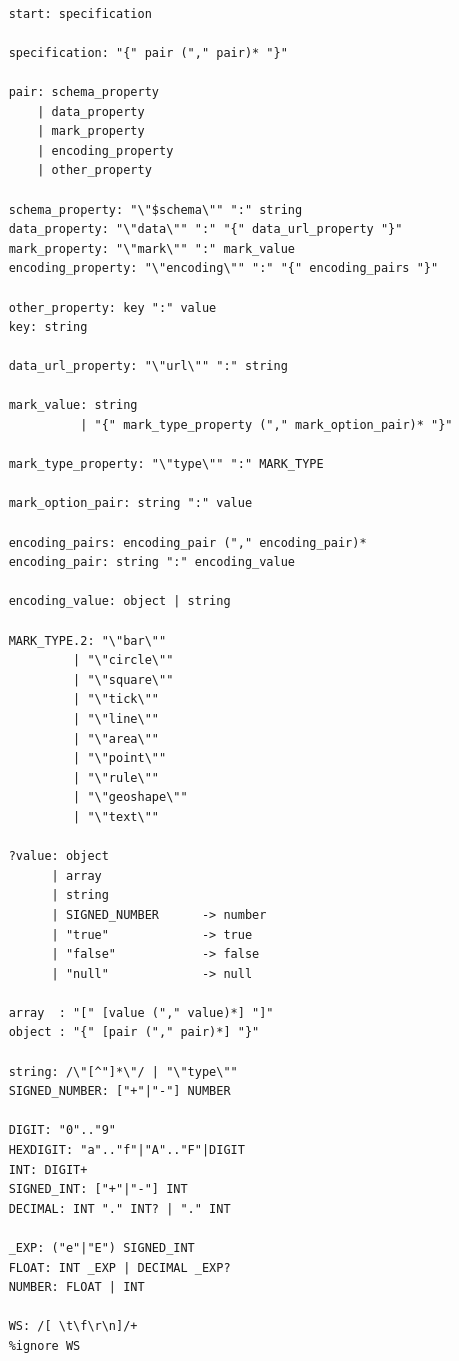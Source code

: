 \begin{lstlisting}[style=myGrammarStyle, caption=Vega-lite grammar]

    start: specification

    specification: "{" pair ("," pair)* "}"

    pair: schema_property
        | data_property
        | mark_property
        | encoding_property
        | other_property

    schema_property: "\"$schema\"" ":" string
    data_property: "\"data\"" ":" "{" data_url_property "}"
    mark_property: "\"mark\"" ":" mark_value
    encoding_property: "\"encoding\"" ":" "{" encoding_pairs "}"
    
    other_property: key ":" value
    key: string

    data_url_property: "\"url\"" ":" string

    mark_value: string
              | "{" mark_type_property ("," mark_option_pair)* "}"

    mark_type_property: "\"type\"" ":" MARK_TYPE

    mark_option_pair: string ":" value

    encoding_pairs: encoding_pair ("," encoding_pair)*
    encoding_pair: string ":" encoding_value

    encoding_value: object | string

    MARK_TYPE.2: "\"bar\"" 
             | "\"circle\"" 
             | "\"square\"" 
             | "\"tick\"" 
             | "\"line\"" 
             | "\"area\"" 
             | "\"point\"" 
             | "\"rule\"" 
             | "\"geoshape\"" 
             | "\"text\""

    ?value: object
          | array
          | string
          | SIGNED_NUMBER      -> number
          | "true"             -> true
          | "false"            -> false
          | "null"             -> null
          
    array  : "[" [value ("," value)*] "]"
    object : "{" [pair ("," pair)*] "}"

    string: /\"[^"]*\"/ | "\"type\""
    SIGNED_NUMBER: ["+"|"-"] NUMBER

    DIGIT: "0".."9"
    HEXDIGIT: "a".."f"|"A".."F"|DIGIT
    INT: DIGIT+
    SIGNED_INT: ["+"|"-"] INT
    DECIMAL: INT "." INT? | "." INT

    _EXP: ("e"|"E") SIGNED_INT
    FLOAT: INT _EXP | DECIMAL _EXP?
    NUMBER: FLOAT | INT

    WS: /[ \t\f\r\n]/+
    %ignore WS
\end{lstlisting}

